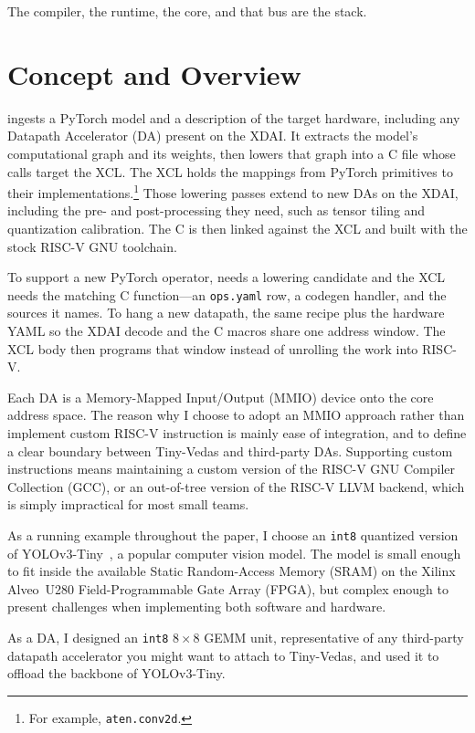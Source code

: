 The compiler, the runtime, the core, and that bus are the stack.

\section{Concept and Overview}

\pyv{} ingests a {PyTorch} model and a description of the target hardware, 
including any Datapath Accelerator ({DA}) present on the
{XDAI}.
It extracts the model's computational graph and its weights, then
lowers that graph into a {C} file whose calls target the {XCL}.
The {XCL} holds the mappings from {PyTorch} primitives to their
implementations.\footnote{For example, \texttt{aten.conv2d}.}
Those lowering passes extend to new {DA}s on the {XDAI}, including the
pre- and post-processing they need, such as tensor tiling and quantization
calibration.
The {C} is then linked against the {XCL} and built with the stock
{RISC-V} {GNU} toolchain.


To support a new {PyTorch} operator, \pyv{} needs a lowering candidate
and the {XCL} needs the matching {C} function---an \texttt{ops.yaml}
row, a codegen handler, and the sources it names.
To hang a new datapath, the same recipe plus the hardware {YAML} so
the {XDAI} decode and the {C} macros share one address window.
The {XCL} body then programs that window instead of unrolling the
work into {RISC-V}.

Each {DA} is a Memory-Mapped Input/Output ({MMIO}) device onto the core address space.
The reason why I choose to adopt an {MMIO} approach rather than implement
custom RISC-V instruction is mainly ease of integration, and to define a clear
boundary between Tiny-Vedas and third-party DAs. Supporting custom instructions
means maintaining a custom version of the {RISC-V} {GNU} Compiler Collection ({GCC}), or an out-of-tree version of
the RISC-V LLVM backend, which is simply impractical for most small teams.

As a running example throughout the paper, I choose an \texttt{int8} quantized version of 
{YOLOv3-Tiny}~\cite{redmon2018yolov3}, a popular computer vision model. The model is small enough to fit inside the
available Static Random-Access Memory ({SRAM}) on the Xilinx Alveo~{U280} Field-Programmable Gate Array ({FPGA}), but complex enough to present challenges when implementing
both software and hardware.

As a DA, I designed an \texttt{int8} $8{\times}8$ GEMM unit, 
representative of any third-party datapath accelerator you might want to attach to Tiny-Vedas,
and used it to offload the backbone of {YOLOv3-Tiny}.
